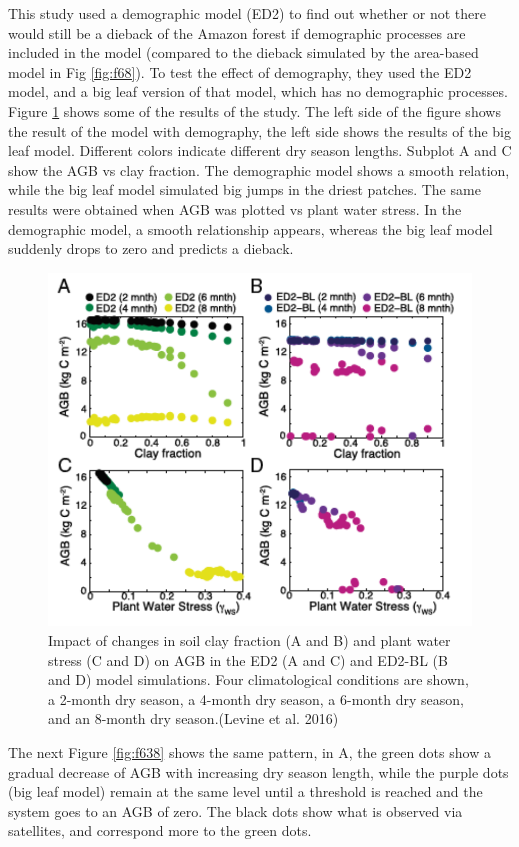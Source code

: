 \documentclass[12pt,oneside]{book}
\begin{document}
This study used a demographic model (ED2) to find out whether or not
there would still be a dieback of the Amazon forest if demographic
processes are included in the model (compared to the dieback simulated
by the area-based model in Fig \ref{fig:f68}). To test the effect of
demography, they used the ED2 model, and a big leaf version of that
model, which has no demographic processes. Figure \ref{fig:f637} shows
some of the results of the study. The left side of the figure shows the
result of the model with demography, the left side shows the results of
the big leaf model. Different colors indicate different dry season
lengths. Subplot A and C show the AGB vs clay fraction. The demographic
model shows a smooth relation, while the big leaf model simulated big
jumps in the driest patches. The same results were obtained when AGB was
plotted vs plant water stress. In the demographic model, a smooth
relationship appears, whereas the big leaf model suddenly drops to zero
and predicts a dieback.

\begin{figure}

{\centering \includegraphics[width=0.8\linewidth]{figures/chap6/f637_levine1} 

}

\caption{Impact of changes in soil clay fraction (A and B) and plant water stress (C and D) on AGB in the ED2 (A and C) and ED2-BL (B and D) model simulations. Four climatological conditions are shown, a 2-month dry season, a 4-month dry season, a 6-month dry season, and an 8-month dry season.(Levine et al. 2016)}\label{fig:f637}
\end{figure}

The next Figure \ref{fig:f638} shows the same pattern, in A, the green
dots show a gradual decrease of AGB with increasing dry season length,
while the purple dots (big leaf model) remain at the same level until a
threshold is reached and the system goes to an AGB of zero. The black
dots show what is observed via satellites, and correspond more to the
green dots.
\end{document}
